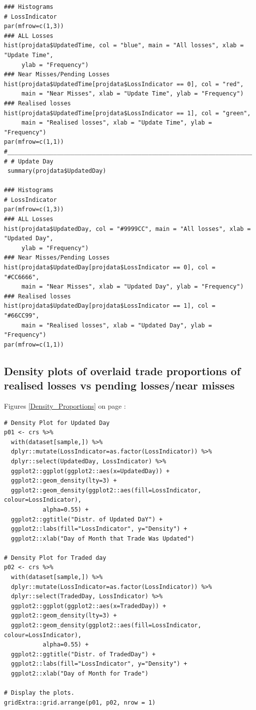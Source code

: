 \documentclass{DissertateUSU}
\begin{document}
\begin{verbatim}
### Histograms
# LossIndicator
par(mfrow=c(1,3))
### ALL Losses
hist(projdata$UpdatedTime, col = "blue", main = "All losses", xlab = "Update Time",
     ylab = "Frequency")
### Near Misses/Pending Losses
hist(projdata$UpdatedTime[projdata$LossIndicator == 0], col = "red",
     main = "Near Misses", xlab = "Update Time", ylab = "Frequency")
### Realised losses
hist(projdata$UpdatedTime[projdata$LossIndicator == 1], col = "green",
     main = "Realised losses", xlab = "Update Time", ylab = "Frequency")
par(mfrow=c(1,1))
#___________________________________________________________________________________________________
# # Update Day
 summary(projdata$UpdatedDay)

### Histograms
# LossIndicator
par(mfrow=c(1,3))
### ALL Losses
hist(projdata$UpdatedDay, col = "#9999CC", main = "All losses", xlab = "Updated Day",
     ylab = "Frequency")
### Near Misses/Pending Losses
hist(projdata$UpdatedDay[projdata$LossIndicator == 0], col = "#CC6666",
     main = "Near Misses", xlab = "Updated Day", ylab = "Frequency")
### Realised losses
hist(projdata$UpdatedDay[projdata$LossIndicator == 1], col = "#66CC99",
     main = "Realised losses", xlab = "Updated Day", ylab = "Frequency")
par(mfrow=c(1,1))
\end{verbatim}

\normalsize

\subsection{Density plots of overlaid trade proportions of realised losses vs pending losses/near misses}
\label{ssec:Density plots}

Figures \ref{Density_Proportions} on page \pageref{Density_Proportions}:

\small

\begin{verbatim}
# Density Plot for Updated Day
p01 <- crs %>%
  with(dataset[sample,]) %>%
  dplyr::mutate(LossIndicator=as.factor(LossIndicator)) %>%
  dplyr::select(UpdatedDay, LossIndicator) %>%
  ggplot2::ggplot(ggplot2::aes(x=UpdatedDay)) +
  ggplot2::geom_density(lty=3) +
  ggplot2::geom_density(ggplot2::aes(fill=LossIndicator, colour=LossIndicator),
           alpha=0.55) +
  ggplot2::ggtitle("Distr. of Updated DaY") +
  ggplot2::labs(fill="LossIndicator", y="Density") +
  ggplot2::xlab("Day of Month that Trade Was Updated")

# Density Plot for Traded day
p02 <- crs %>%
  with(dataset[sample,]) %>%
  dplyr::mutate(LossIndicator=as.factor(LossIndicator)) %>%
  dplyr::select(TradedDay, LossIndicator) %>%
  ggplot2::ggplot(ggplot2::aes(x=TradedDay)) +
  ggplot2::geom_density(lty=3) +
  ggplot2::geom_density(ggplot2::aes(fill=LossIndicator, colour=LossIndicator),
           alpha=0.55) +
  ggplot2::ggtitle("Distr. of TradedDay") +
  ggplot2::labs(fill="LossIndicator", y="Density") +
  ggplot2::xlab("Day of Month for Trade")

# Display the plots.
gridExtra::grid.arrange(p01, p02, nrow = 1)
\end{verbatim}
\end{document}
